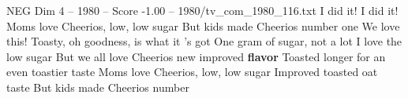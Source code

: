 \begin{textsample}{NEG Dim 4 – 1980 – Score -1.00 – 1980/tv\_com\_1980\_116.txt}  \label{ex:f4_neg_038}
I did it!
I did it!
Moms love Cheerios, low, low sugar But kids made Cheerios number one We love this!
Toasty, oh goodness, is what it 's got One gram of sugar, not a lot I love the low sugar But we all love Cheerios new improved \textbf{flavor} Toasted longer for an even toastier taste Moms love Cheerios, low, low sugar Improved toasted oat taste But kids made Cheerios number

\end{textsample}
